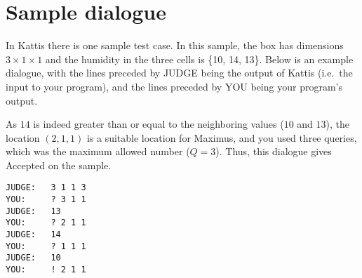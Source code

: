 \section*{Sample dialogue}
In Kattis there is one sample test case.
In this sample, the box has dimensions $3\times 1\times 1$ and the humidity in the three cells is \{10, 14, 13\}.
Below is an example dialogue, with the lines preceded by JUDGE being the output of Kattis (i.e.\ the input to your program), and the lines preceded by YOU being your program's output.

As $14$ is indeed greater than or equal to the neighboring values ($10$ and $13$), the location $(2,1,1)$ is a suitable location for Maximus, and you used three queries, which was the maximum allowed number ($Q=3$). Thus, this dialogue gives Accepted on the sample.

\begin{verbatim}
JUDGE:   3 1 1 3
YOU:     ? 3 1 1
JUDGE:   13
YOU:     ? 2 1 1
JUDGE:   14
YOU:     ? 1 1 1
JUDGE:   10
YOU:     ! 2 1 1
\end{verbatim}
